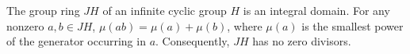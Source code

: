 The group ring $JH$ of an infinite cyclic group $H$ is an integral domain. For any nonzero $a,b \in JH$, $\mu(ab) = \mu(a) + \mu(b)$, where $\mu(a)$ is the smallest power of the generator occurring in $a$. Consequently, $JH$ has no zero divisors.

